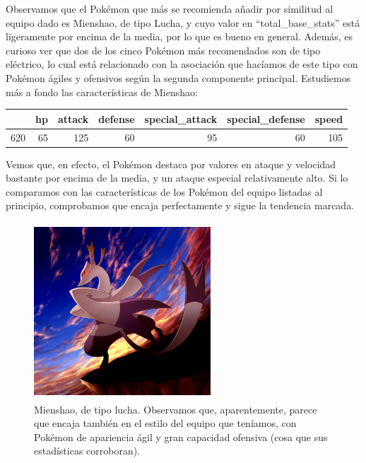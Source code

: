 \documentclass[
  12pt,
]{extreport}
\begin{document}
Observamos que el Pokémon que más se recomienda añadir por similitud al
equipo dado es Mienshao, de tipo Lucha, y cuyo valor en
``total\_base\_stats'' está ligeramente por encima de la media, por lo
que es bueno en general. Además, es curioso ver que dos de los cinco
Pokémon más recomendados son de tipo eléctrico, lo cual está relacionado
con la asociación que hacíamos de este tipo con Pokémon ágiles y
ofensivos según la segunda componente principal. Estudiemos más a fondo
las características de Mienshao:

\begin{table}[H]
\centering\begingroup\fontsize{11.5}{13.5}\selectfont

\begin{tabular}{lrrrrrr}
\toprule
  & hp & attack & defense & special\_attack & special\_defense & speed\\
\midrule
620 & 65 & 125 & 60 & 95 & 60 & 105\\
\bottomrule
\end{tabular}
\endgroup{}
\end{table}

Vemos que, en efecto, el Pokémon destaca por valores en ataque y
velocidad bastante por encima de la media, y un ataque especial
relativamente alto. Si lo comparamos con las características de los
Pokémon del equipo listadas al principio, comprobamos que encaja
perfectamente y sigue la tendencia marcada.

\begin{figure}[H]

{\centering \includegraphics[width=2.60417in,height=2.60417in]{trabajo_images/Mienshao.jpg}

}

\caption{Mienshao, de tipo lucha. Observamos que, aparentemente, parece
que encaja también en el estilo del equipo que teníamos, con Pokémon de
apariencia ágil y gran capacidad ofensiva (cosa que sus estadísticas
corroboran).}

\end{figure}%
\end{document}
